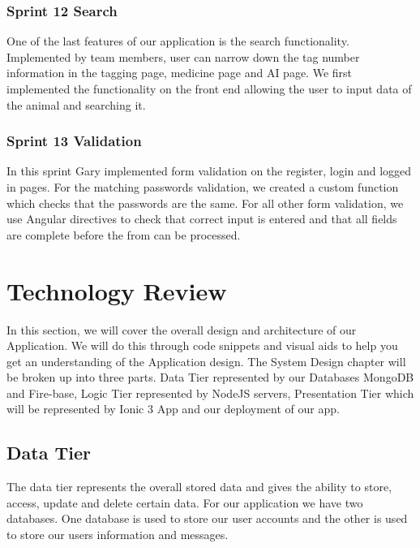 \documentclass[12pt,a4paper,oneside,openany]{book}
\begin{document}
\subsection{Sprint 12 Search}
One of the last features of our application is the search functionality. Implemented by team members, user can narrow down the tag number information in the tagging page, medicine page and AI page. We first implemented the functionality on the front end allowing the user to input data of the animal and searching it.

\subsection{Sprint 13 Validation}
In this sprint Gary implemented form validation on the register, login and logged in pages. For the matching passwords validation, we created a custom function which checks that the passwords are the same. For all other form validation, we use Angular directives to check that correct input is entered and that all fields are complete before the from can be processed.

\chapter{Technology Review}
In this section, we will cover the overall design and architecture of our Application. We will do this through code snippets and visual aids to help you get an understanding of the Application design. The System Design chapter will be broken up into three parts. Data Tier represented by our Databases MongoDB and Fire-base, Logic Tier represented by NodeJS servers, Presentation Tier which will be represented by Ionic 3 App and our deployment of our app. 

\section{Data Tier}
The data tier represents the overall stored data and gives the ability to store, access, update and delete certain data. For our application we have two databases. One database is used to store our user accounts and the other is used to store our users information and messages.
\end{document}
